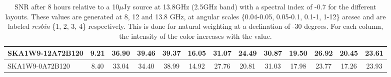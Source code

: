 \begin{table}[!htp]
{{\begin{tabular}{|lcccc||cccc||cccc|}
SKA1W9-12A72B120 & 9.21 \cellcolor{blue!60.00} & 36.90 \cellcolor{red!60.00} & 39.46 \cellcolor{green!60.00} & 39.37 \cellcolor{orange!60.00} & 16.05 \cellcolor{blue!60.00} & 31.07 \cellcolor{red!60.00} & 24.49 \cellcolor{green!60.00} & 30.87 \cellcolor{orange!18.00} & 19.50 \cellcolor{blue!60.00} & 26.92 \cellcolor{red!60.00} & 20.45 \cellcolor{green!60.00} & 23.61 \cellcolor{orange!18.00}\\ \hline 
SKA1W9-0A72B120 & 8.40 \cellcolor{blue!48.27} & 33.04 \cellcolor{red!47.71} & 34.40 \cellcolor{green!42.64} & 38.99 \cellcolor{orange!18.00} & 14.92 \cellcolor{blue!52.82} & 27.76 \cellcolor{red!47.18} & 20.81 \cellcolor{green!24.71} & 31.03 \cellcolor{orange!24.59} & 17.98 \cellcolor{blue!52.83} & 23.77 \cellcolor{red!45.77} & 17.26 \cellcolor{green!18.00} & 23.93 \cellcolor{orange!26.15}\tabularnewline \hline 
\end{tabular}}\hfil 

\caption{SNR after 8 hours relative to a 10$\mu$Jy source at 13.8GHz (2.5GHz band) with a spectral index of -0.7 for the different layouts. These values are generated at 8, 12 and 13.8 GHz, at angular scales \{0.04-0.05, 0.05-0.1, 0.1-1, 1-12\} arcsec and are labeled {\it resbin} \{1, 2, 3, 4\} respectively. This is done for natural weighting at a declination of -30 degrees. For each column, the intensity of the color increases with the value.}\label{tab:snr10}}
 \end{table}